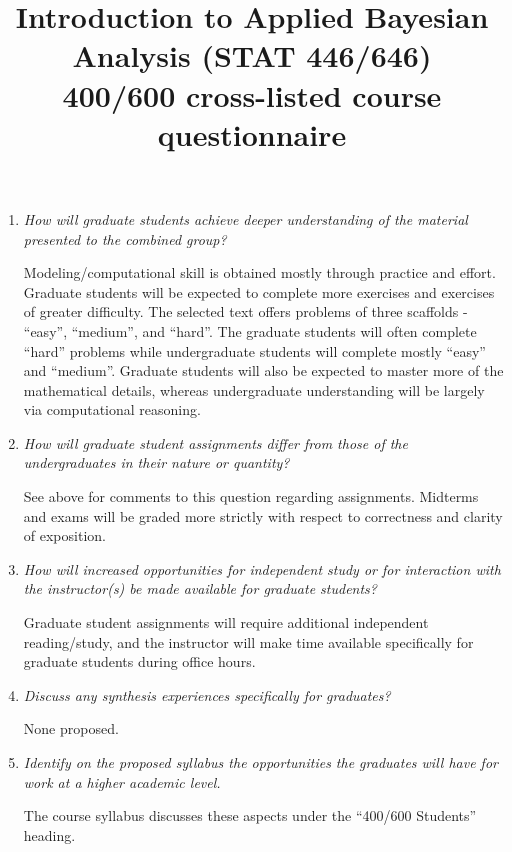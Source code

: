 \documentclass[11pt,onecolumn]{article}
\title{Introduction to Applied Bayesian Analysis (STAT 446/646) \\ 400/600 cross-listed course questionnaire}
\begin{document}
\date{}
\maketitle

\vspace{-0.5in}

\begin{enumerate}
\item \emph{How will graduate students achieve deeper understanding of the material presented to the combined group?}

  Modeling/computational skill is obtained mostly through practice and effort. Graduate students will be expected to complete more exercises and exercises of greater difficulty. The selected text offers problems of three scaffolds - ``easy'', ``medium'', and ``hard''. The graduate students will often complete ``hard'' problems while undergraduate students will complete mostly ``easy'' and ``medium''. Graduate students will also be expected to master more of the mathematical details, whereas undergraduate understanding will be largely via computational reasoning.
  
\item \emph{How will graduate student assignments differ from those of the undergraduates in their nature or quantity?}

  See above for comments to this question regarding assignments. Midterms and exams will be graded more strictly with respect to correctness and clarity of exposition.

\item \emph{How will increased opportunities for independent study or for interaction with the instructor(s) be made available for graduate students?}

  Graduate student assignments will require additional independent reading/study, and the instructor will make time available specifically for graduate students during office hours. 
  
\item \emph{Discuss any synthesis experiences specifically for graduates?}

  None proposed.

\item \emph{Identify on the proposed syllabus the opportunities the graduates will have for work at a higher academic level.}

  The course syllabus discusses these aspects under the ``400/600 Students'' heading. 


\end{enumerate}
\end{document}
